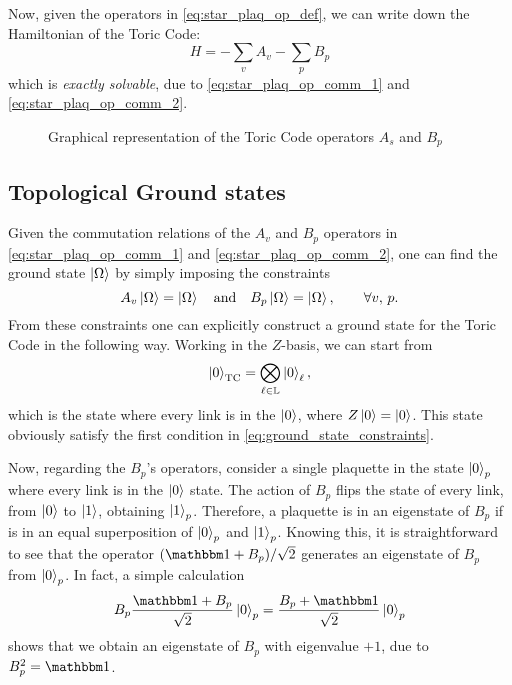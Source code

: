 Now, given the operators in \eqref{eq:star_plaq_op_def}, we can write down the Hamiltonian of the Toric Code:
\begin{equation}
    H = - \sum_{v} A_v - \sum_{p} B_p
    \label{eq:toric_code_hamiltonian}
\end{equation}
which is \emph{exactly solvable}, due to \eqref{eq:star_plaq_op_comm_1} and \eqref{eq:star_plaq_op_comm_2}.
\begin{figure}[t]
    \centering
    
    \caption{Graphical representation of the Toric Code operators $A_s$ and $B_p$}
    \label{fig:toric_code_operators}
\end{figure}



%
%
\subsection{Topological Ground states}
\label{sub:topological_ground_states}

Given the commutation relations of the $A_v$ and $B_p$ operators in \eqref{eq:star_plaq_op_comm_1} and \eqref{eq:star_plaq_op_comm_2}, one can find the ground state $\ket{\Omega}$ by simply imposing the constraints
\begin{equation}
    A_v \ket{\Omega} = \ket{\Omega} \qand
    B_p \ket{\Omega} = \ket{\Omega}, \qquad \forall v,\, p.
    \label{eq:ground_state_constraints}
\end{equation}
From these constraints one can explicitly construct a ground state for the Toric Code in the following way.
Working in the $Z$-basis, we can start from
\begin{equation}
    \ket{0}_{\text{TC}} = \bigotimes_{\ell \in \mathbb{L}} \ket{0}_{\ell},
\end{equation}
which is the state where every link is in the $\ket{0}$, where $Z \ket{0} = \ket{0}$.
This state obviously satisfy the first condition in \eqref{eq:ground_state_constraints}.

Now, regarding the $B_p$'s operators, consider a single plaquette in the state $\ket{0}_p$ where every link is in the $\ket{0}$ state.
The action of $B_p$ flips the state of every link, from $\ket{0}$ to $\ket{1}$, obtaining $\ket{1}_p$.
Therefore, a plaquette is in an eigenstate of $B_p$ if is in an equal superposition of $\ket{0}_p$ and $\ket{1}_p$.
Knowing this, it is straightforward to see that the operator $(\identity + B_p)/\sqrt{2}$ generates an eigenstate of $B_p$ from $\ket{0}_p$.
In fact, a simple calculation
\begin{equation}
    B_p \frac{\identity + B_p}{\sqrt{2}} \ket{0}_p = \frac{B_p + \identity}{\sqrt{2}} \ket{0}_p
\end{equation}
shows that we obtain an eigenstate of $B_p$ with eigenvalue $+1$, due to $B_p^2 = \identity$.

